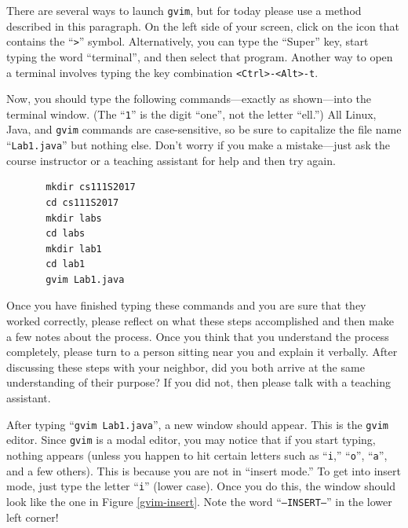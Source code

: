 There are several ways to launch {\tt gvim}, but for today please use a method described in this paragraph.  On the
left side of your screen, click on the icon that contains the ``{\tt >}'' symbol.  Alternatively, you can type the
``Super'' key, start typing the word ``terminal'', and then select that program.  Another way to open a terminal
involves typing the key combination {\tt <Ctrl>-<Alt>-t}.


Now, you should type the following commands---exactly as shown---into the terminal window.  (The ``{\tt 1}'' is the
  digit ``one'', not the letter ``ell.'') All Linux, Java, and {\tt gvim} commands are case-sensitive, so be sure to
capitalize the file name ``{\tt Lab1.java}'' but nothing else.  Don't worry if you make a mistake---just ask the course
instructor or a teaching assistant for help and then try again.

\vspace*{-.1in}
\begin{verbatim}
       mkdir cs111S2017
       cd cs111S2017
       mkdir labs
       cd labs
       mkdir lab1
       cd lab1
       gvim Lab1.java
\end{verbatim}
\vspace*{-.1in}

Once you have finished typing these commands and you are sure that they worked correctly, please reflect on what these
steps accomplished and then make a few notes about the process. Once you think that you understand the process
completely, please turn to a person sitting near you and explain it verbally. After discussing these steps with your
neighbor, did you both arrive at the same understanding of their purpose? If you did not, then please talk with a
teaching assistant.

After typing ``{\tt gvim Lab1.java}'', a new window should appear. This is the {\tt gvim} editor.  Since {\tt gvim} is a
modal editor, you may notice that if you start typing, nothing appears (unless you happen to hit certain letters such as
  ``{\tt i},'' ``{\tt o}'', ``{\tt a}'', and a few others). This is because you are not in ``insert mode.'' To get into
insert mode, just type the letter ``{\tt i}'' (lower case). Once you do this, the window should look like the one in
Figure \ref{gvim-insert}. Note the word ``{\tt --INSERT--}'' in the lower left corner!

